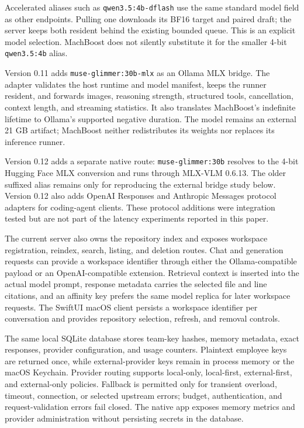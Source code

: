 \documentclass[11pt]{article}
\begin{document}
Accelerated aliases such as \texttt{qwen3.5:4b-dflash} use the same standard
model field as other endpoints. Pulling one downloads its BF16 target and paired
draft; the server keeps both resident behind the existing bounded queue. This is
an explicit model selection. MachBoost does not silently substitute it for the
smaller 4-bit \texttt{qwen3.5:4b} alias.

Version 0.11 adds \texttt{muse-glimmer:30b-mlx} as an Ollama MLX bridge. The
adapter validates the host runtime and model manifest, keeps the runner
resident, and forwards images, reasoning strength, structured tools,
cancellation, context length, and streaming statistics. It also translates
MachBoost's indefinite lifetime to Ollama's supported negative duration. The
model remains an external 21 GB artifact; MachBoost neither redistributes its
weights nor replaces its inference runner.

Version 0.12 adds a separate native route: \texttt{muse-glimmer:30b} resolves
to the 4-bit Hugging Face MLX conversion and runs through MLX-VLM 0.6.13. The
older suffixed alias remains only for reproducing the external bridge study
below. Version 0.12 also adds OpenAI Responses and Anthropic Messages protocol
adapters for coding-agent clients. These protocol additions were integration
tested but are not part of the latency experiments reported in this paper.

The current server also owns the repository index and exposes workspace
registration, reindex, search, listing, and deletion routes. Chat and generation
requests can provide a workspace identifier through either the
Ollama-compatible payload or an OpenAI-compatible extension. Retrieval context
is inserted into the actual model prompt, response metadata carries the
selected file and line citations, and an affinity key prefers the same model
replica for later workspace requests. The SwiftUI macOS client persists a
workspace identifier per conversation and provides repository selection,
refresh, and removal controls.

The same local SQLite database stores team-key hashes, memory metadata, exact
responses, provider configuration, and usage counters. Plaintext employee keys
are returned once, while external-provider keys remain in process memory or the
macOS Keychain. Provider routing supports local-only, local-first,
external-first, and external-only policies. Fallback is permitted only for
transient overload, timeout, connection, or selected upstream errors; budget,
authentication, and request-validation errors fail closed. The native app
exposes memory metrics and provider administration without persisting secrets in
the database.
\end{document}
